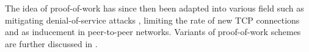 The idea of proof-of-work has since then been adapted into various field such as mitigating denial-of-service attacks \cite{mankins}, limiting the rate of new TCP connections \cite{JuelsB99} and as inducement in peer-to-peer networks\cite{bitcoin,p2p}. Variants of proof-of-work schemes are further discussed in .

\begin{comment}
\begin{GrayBox}[0.75\textwidth]
Impose each request with a cost (e.g. show proof of work to access a service )
\end{GrayBox}
\end{comment}






			
